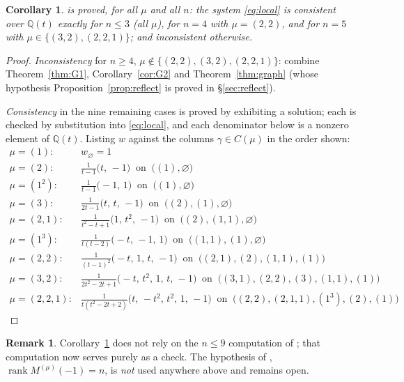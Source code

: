 \documentclass[11pt]{article}
\newtheorem{corollary}[theorem]{Corollary}
\theoremstyle{definition}
\newtheorem{remark}[theorem]{Remark}
\newcommand{\Q}{\mathbb{Q}}
\begin{document}
\begin{corollary}\label{cor:class}
\cite[Thm.~3.1]{Q140} is proved, for all $\mu$ and all $n$: the system \eqref{eq:local} is
consistent over $\Q(t)$ exactly for $n\le3$ \textup{(}all $\mu$\textup{)}, for $n=4$ with
$\mu=(2,2)$, and for $n=5$ with $\mu\in\{(3,2),(2,2,1)\}$; and inconsistent otherwise.
\end{corollary}

\begin{proof}
\emph{Inconsistency} for $n\ge4$, $\mu\notin\{(2,2),(3,2),(2,2,1)\}$: combine
Theorem~\ref{thm:G1}, Corollary~\ref{cor:G2} and Theorem~\ref{thm:graph} (whose hypothesis
Proposition~\ref{prop:reflect} is proved in \S\ref{sec:reflect}).

\emph{Consistency} in the nine remaining cases is proved by exhibiting a solution; each is
checked by substitution into \eqref{eq:local}, and each denominator below is a nonzero element
of $\Q(t)$. Listing $w$ against the columns $\gamma\in C(\mu)$ in the order shown:
\[
\begin{array}{ll}
\mu=(1): & w_{\varnothing}=1 \\
\mu=(2): & \tfrac{1}{t-1}\bigl(t,\,-1\bigr) \ \text{ on }\ \bigl((1),\varnothing\bigr) \\
\mu=(1^2): & \tfrac{1}{t-1}\bigl(-1,\,1\bigr) \ \text{ on }\ \bigl((1),\varnothing\bigr) \\
\mu=(3): & \tfrac{1}{2t-1}\bigl(t,\,t,\,-1\bigr) \ \text{ on }\ \bigl((2),(1),\varnothing\bigr) \\
\mu=(2,1): & \tfrac{1}{t^2-t+1}\bigl(1,\,t^2,\,-1\bigr) \ \text{ on }\ \bigl((2),(1,1),\varnothing\bigr) \\
\mu=(1^3): & \tfrac{1}{t(t-2)}\bigl(-t,\,-1,\,1\bigr) \ \text{ on }\ \bigl((1,1),(1),\varnothing\bigr) \\
\mu=(2,2): & \tfrac{1}{(t-1)^2}\bigl(-t,\,1,\,t,\,-1\bigr) \ \text{ on }\ \bigl((2,1),(2),(1,1),(1)\bigr) \\
\mu=(3,2): & \tfrac{1}{2t^2-2t+1}\bigl(-t,\,t^2,\,1,\,t,\,-1\bigr) \ \text{ on }\ \bigl((3,1),(2,2),(3),(1,1),(1)\bigr) \\
\mu=(2,2,1): & \tfrac{1}{t(t^2-2t+2)}\bigl(t,\,-t^2,\,t^2,\,1,\,-1\bigr) \ \text{ on }\ \bigl((2,2),(2,1,1),(1^3),(2),(1)\bigr)
\end{array}
\]
\vspace{-1.5em}
\end{proof}

\begin{remark}
Corollary~\ref{cor:class} does not rely on the $n\le9$ computation of \cite[\S6]{Q140}; that
computation now serves purely as a check. The hypothesis of \cite[Prop.~5.2]{Q140},
$\operatorname{rank}M^{(\mu)}(-1)=n$, is \emph{not} used anywhere above and remains open.
\end{remark}
\end{document}
